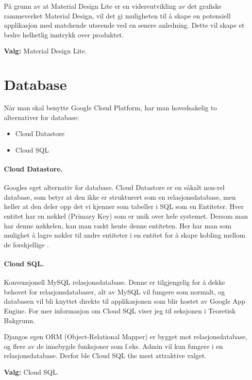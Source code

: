 På grunn av at Material Design Lite er en videreutvikling av det grafiske rammeverket Material Design, vil det gi muligheten til å skape en potensiell applikasjon med matchende utseende ved en senere anledning. Dette vil skape et bedre helhetlig inntrykk over produktet.


\textbf{Valg:} Material Design Lite.


\clearpage
\section{Database}
Når man skal benytte Google Cloud Platform, har man hovedsakelig  to alternativer for database:
\begin{itemize}
\setlength\itemsep{0em}
\item Cloud Datastore
\item Cloud SQL
\end{itemize}
\paragraph{Cloud Datastore.} Googles eget alternativ for database. Cloud Datastore er en såkalt non-rel database, som betyr at den ikke er strukturert som en relasjonsdatabase, men heller at den deler opp det vi kjenner som tabeller i SQL som en Entiteter. Hver entitet har en nøkkel (Primary Key) som er unik over hele systemet. Dersom man har denne nøkkelen, kan man raskt hente denne entiteten. Her har man som mulighet å lagre nøkler til andre entiteter i en entitet for å skape kobling mellom de forskjellige \citep{gae:devpython}.

\paragraph{Cloud SQL.} Konvensjonell MySQL relasjonsdatabase. Denne er tilgjengelig for å dekke behovet for relasjonsdatabaser, alt av MySQL vil fungere som normalt, og databasen vil bli knyttet direkte til applikasjonen som blir hostet av Google App Engine. For mer informasjon om Cloud SQL viser jeg til seksjonen  i Teoretisk Bakgrunn.

Djangos egen ORM (Object-Relational Mapper) er bygget mot relasjonsdatabase, og flere av de innebygde funksjoner som f.eks. Admin vil kun fungere i en relasjonsdatabase. Derfor ble Cloud SQL the mest attraktive valget.

\textbf{Valg:} Cloud SQL.

